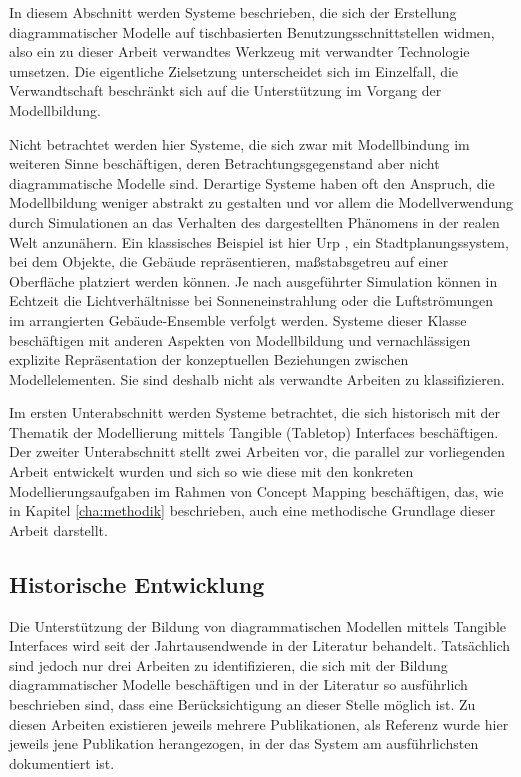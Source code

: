 In diesem Abschnitt werden Systeme beschrieben, die sich der Erstellung diagrammatischer Modelle auf tischbasierten Benutzungsschnittstellen widmen, also ein zu dieser Arbeit verwandtes Werkzeug mit verwandter Technologie umsetzen. Die eigentliche Zielsetzung unterscheidet sich im Einzelfall, die Verwandtschaft beschränkt sich auf die Unterstützung im Vorgang der Modellbildung.

Nicht betrachtet werden hier Systeme, die sich zwar mit Modellbindung im weiteren Sinne beschäftigen, deren Betrachtungsgegenstand aber nicht diagrammatische Modelle sind. Derartige Systeme haben oft den Anspruch, die Modellbildung weniger abstrakt zu gestalten und vor allem die Modellverwendung durch Simulationen an das Verhalten des dargestellten Phänomens in der realen Welt anzunähern. Ein klassisches Beispiel ist hier Urp \citep{Underkoffler99}, ein Stadtplanungssystem, bei dem Objekte, die Gebäude repräsentieren, maßstabsgetreu auf einer Oberfläche platziert werden können. Je nach ausgeführter Simulation können in Echtzeit die Lichtverhältnisse bei Sonneneinstrahlung oder die Luftströmungen im arrangierten Gebäude-Ensemble verfolgt werden. Systeme dieser Klasse beschäftigen mit anderen Aspekten von Modellbildung und vernachlässigen explizite Repräsentation der konzeptuellen Beziehungen zwischen Modellelementen. Sie sind deshalb nicht als verwandte Arbeiten zu klassifizieren.

Im ersten Unterabschnitt werden Systeme betrachtet, die sich historisch mit der Thematik der Modellierung mittels Tangible (Tabletop) Interfaces beschäftigen. Der zweiter Unterabschnitt stellt zwei Arbeiten vor, die parallel zur vorliegenden Arbeit entwickelt wurden und sich so wie diese mit den konkreten Modellierungsaufgaben im Rahmen von Concept Mapping beschäftigen, das, wie in Kapitel \ref{cha:methodik} beschrieben, auch eine methodische Grundlage dieser Arbeit darstellt. 

\subsection{Historische Entwicklung} %
\label{sub:historische_entwicklung}

Die Unterstützung der Bildung von diagrammatischen Modellen mittels Tangible Interfaces wird seit der Jahrtausendwende in der Literatur behandelt. Tatsächlich sind jedoch nur drei Arbeiten zu identifizieren, die sich mit der Bildung diagrammatischer Modelle beschäftigen und in der Literatur so ausführlich beschrieben sind, dass eine Berücksichtigung an dieser Stelle möglich ist. Zu diesen Arbeiten existieren jeweils mehrere Publikationen, als Referenz wurde hier jeweils jene Publikation herangezogen, in der das System am ausführlichsten dokumentiert ist.

